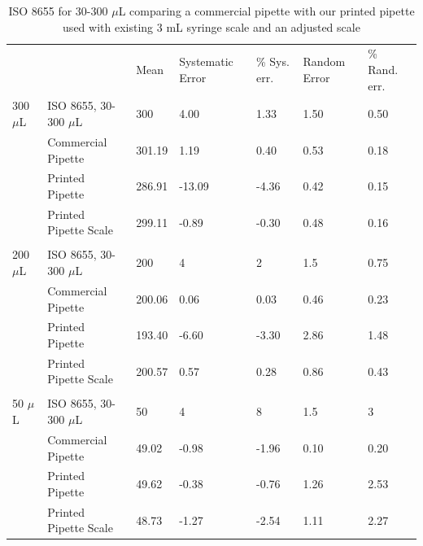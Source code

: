 \documentclass[10pt,letterpaper]{article}
\begin{document}
\begin{table}[!ht]
	\begin{adjustwidth}{-2.25in}{0in} %
		\centering
		\caption{ISO 8655 for 30-300 $\mu$L comparing a commercial pipette with our printed pipette used with existing 3 mL syringe scale and an adjusted scale}
		\label{table4}
		\begin{tabular}{lllllll}
			&                       & Mean   & Systematic Error & \% Sys. err. & Random Error & \% Rand. err. \\
			300 $\mu$L & ISO 8655, 30-300 $\mu$L   & 300    & 4.00             & 1.33         & 1.50         & 0.50          \\
			& Commercial Pipette    & 301.19 & 1.19             & 0.40         & 0.53         & 0.18          \\
			& Printed Pipette       & 286.91 & -13.09           & -4.36        & 0.42         & 0.15          \\
			& Printed Pipette Scale & 299.11 & -0.89            & -0.30        & 0.48         & 0.16          \\
			&                       &        &                  &              &              &               \\
			200 $\mu$L & ISO 8655, 30-300 $\mu$L   & 200    & 4                & 2            & 1.5          & 0.75          \\
			& Commercial Pipette    & 200.06 & 0.06             & 0.03         & 0.46         & 0.23          \\
			& Printed Pipette       & 193.40 & -6.60            & -3.30        & 2.86         & 1.48          \\
			& Printed Pipette Scale & 200.57 & 0.57             & 0.28         & 0.86         & 0.43          \\
			&                       &        &                  &              &              &               \\
			50 $\mu$L  & ISO 8655, 30-300 $\mu$L   & 50     & 4                & 8            & 1.5          & 3             \\
			& Commercial Pipette    & 49.02  & -0.98            & -1.96        & 0.10         & 0.20          \\
			& Printed Pipette       & 49.62  & -0.38            & -0.76        & 1.26         & 2.53          \\
			& Printed Pipette Scale & 48.73  & -1.27            & -2.54        & 1.11         & 2.27          \\

\end{tabular}
\end{adjustwidth}
\end{table}
\end{document}
